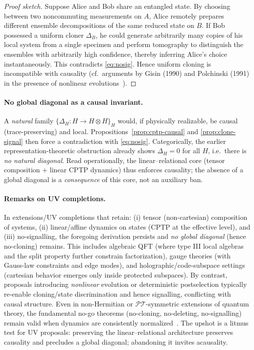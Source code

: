 \documentclass[11pt]{article}
\theoremstyle{upright}
\begin{document}
\begin{proof}[Proof sketch]
Suppose Alice and Bob share an entangled state. By choosing between two noncommuting measurements on $A$, Alice remotely prepares different ensemble decompositions of the same reduced state on $B$. If Bob possessed a uniform cloner $\Delta_B$, he could generate arbitrarily many copies of his local system from a single specimen and perform tomography to distinguish the ensembles with arbitrarily high confidence, thereby inferring Alice's choice instantaneously. This contradicts \eqref{eq:nosig}. Hence uniform cloning is incompatible with causality (cf.\ arguments by Gisin (1990) and Polchinski (1991) in the presence of nonlinear evolutions~\cite{Gisin1990,Polchinski1991}).
\end{proof}

\paragraph{No global diagonal as a causal invariant.}
A \emph{natural} family $\{\Delta_H:H\!\to\!H\otimes H\}_H$ would, if physically realizable, be causal (trace-preserving) and local. Propositions~\ref{prop:cptp-causal} and \ref{prop:clone-signal} then force a contradiction with \eqref{eq:nosig}. Categorically, the earlier representation-theoretic obstruction already shows $\Delta_H=0$ for all $H$, i.e.\ there is \emph{no natural diagonal}. Read operationally, the linear--relational core (tensor composition $+$ linear CPTP dynamics) thus enforces causality; the absence of a global diagonal is a \emph{consequence} of this core, not an auxiliary ban.

\paragraph{Remarks on UV completions.}
In extensions/UV completions that retain: (i) tensor (non-cartesian) composition of systems, (ii) linear/affine dynamics on states (CPTP at the effective level), and (iii) no-signalling, the foregoing derivation persists and \emph{no global diagonal} (hence no-cloning) remains. This includes algebraic QFT (where type III local algebras and the split property further constrain factorization), gauge theories (with Gauss-law constraints and edge modes), and holographic/code-subspace settings (cartesian behavior emerges only inside protected subspaces). By contrast, proposals introducing \emph{nonlinear} evolution or deterministic postselection typically re-enable cloning/state discrimination and hence signalling, conflicting with causal structure. Even in non-Hermitian or $\mathcal{PT}$-symmetric extensions of quantum theory,  the fundamental no-go theorems (no-cloning, no-deleting, no-signalling) 
remain valid when dynamics are consistently normalized~\cite{JuEtAl2019}. The upshot is a litmus test for UV proposals: preserving the linear--relational architecture preserves causality and precludes a global diagonal; abandoning it invites acausality.
\end{document}
